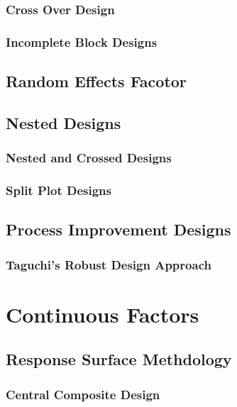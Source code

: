 \subsubsection{Cross Over Design}

\subsubsection{Incomplete Block Designs}


\subsection{Random Effects Facotor}

\subsection{Nested Designs}


\subsubsection{Nested and Crossed Designs}

\subsubsection{Split Plot Designs}




\subsection{Process Improvement Designs}

\subsubsection{Taguchi's Robust Design Approach}



\section{Continuous Factors}



\subsection{Response Surface Methdology}

\subsubsection{Central Composite Design}

